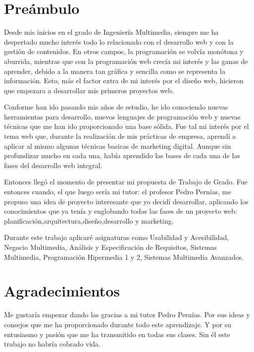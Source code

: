 \chapter*{Preámbulo}

Desde mis inicios en el grado de Ingeniería Multimedia, siempre me ha despertado mucho interés todo lo relacionado con el desarrollo web y
con la gestión de contenidos. En otros campos, la programación se volvía monótona y aburrida, mientras que con la programación web crecía mi interés y
las ganas de aprender, debido a la manera tan gráfica y sencilla como se representa la información. Esto, más el factor extra de mi interés por
el diseño web, hicieron que empezara a desarrollar mis primeros proyectos web.

\vspace{5 mm}

Conforme han ido pasando mis años de estudio, he ido conociendo nuevas herramientas para desarrollo, nuevos lenguajes de programación web y nuevas técnicas que me
han ido proporcionado una base sólida. Fue tal mi interés por el tema web que, durante la realización de mis prácticas de empresa, aprendí a aplicar al mismo algunas técnicas basicas de
marketing digital. Aunque sin profundizar mucho en cada una, había aprendido las bases de cada una de las fases del desarrollo web integral.

\vspace{5 mm}

Entonces llegó el momento de presentar mi propuesta de Trabajo de Grado. Fue entonces cuando, el que luego sería mi tutor: el profesor Pedro Pernías, me propuso una idea de proyecto interesante que yo decidí
desarrollar, aplicando los conocimientos que ya tenía y englobando todas las fases de un proyecto web: planificación,arquitectura,diseño,desarrollo y marketing.

\vspace{5 mm}

Durante este trabajo aplicaré asignaturas como Usabilidad y Acesibilidad, Negocio Multimedia, Análisis y Especificación de Requisitos, Sistemas Multimedia,
Programación Hipermedia 1 y 2, Sistemas Multimedia Avanzados.




\chapter*{Agradecimientos}

Me gustaría empezar dando las gracias a mi tutor Pedro Pernías. Por sus ideas y consejos que me ha proporcionado durante todo este aprendizaje.
Y por su entusiasmo y pasión que me ha transmitido en todas sus clases. Sin él este trabajo no habría cobrado vida.

